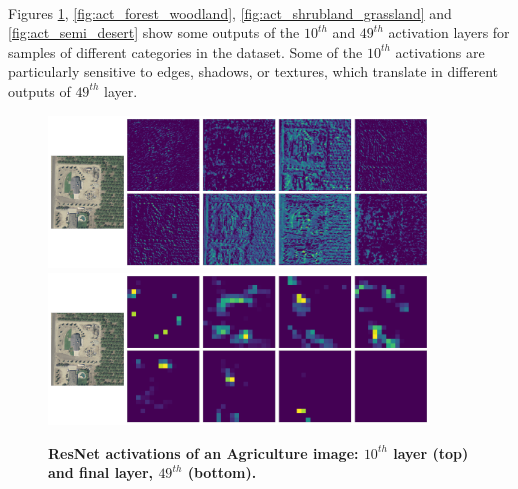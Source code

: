 \

Figures \ref{fig:act_agriculture}, \ref{fig:act_forest_woodland}, \ref{fig:act_shrubland_grassland} and \ref{fig:act_semi_desert} show some outputs of the $10^{th}$ and $49^{th}$ activation layers for samples of different categories in the dataset. Some of the $10^{th}$ activations are particularly sensitive to edges, shadows, or textures, which translate in different outputs of $49^{th}$ layer.

\begin{figure}[h!]
	\centering
	\includegraphics[width=0.9\textwidth]{Figures/activations/agriculture_l2_s1_activation_10.png}
	\includegraphics[width=0.9\textwidth]{Figures/activations/agriculture_l2_s1_activation_49.png}
	\captionsetup{width=1\linewidth}
	\caption{\textbf{ResNet activations of an Agriculture image: $10^{th}$ layer (top) and final layer, $49^{th}$ (bottom).}}
	\label{fig:act_agriculture}
\end{figure}

